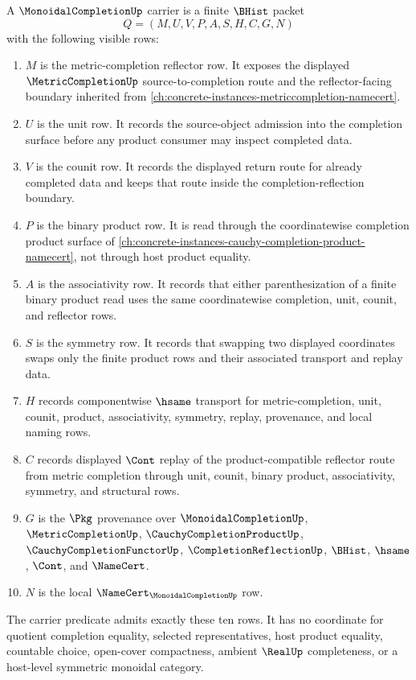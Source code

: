 \begin{definition}
\label{def:monoidal-completion-carrier}
A $\MonoidalCompletionUp$ carrier is a finite $\BHist$ packet
$$
Q=(M,U,V,P,A,S,H,C,G,N)
$$
with the following visible rows:
\begin{enumerate}
\item $M$ is the metric-completion reflector row. It exposes the displayed $\MetricCompletionUp$ source-to-completion route and the reflector-facing boundary inherited from \autoref{ch:concrete-instances-metriccompletion-namecert}.
\item $U$ is the unit row. It records the source-object admission into the completion surface before any product consumer may inspect completed data.
\item $V$ is the counit row. It records the displayed return route for already completed data and keeps that route inside the completion-reflection boundary.
\item $P$ is the binary product row. It is read through the coordinatewise completion product surface of \autoref{ch:concrete-instances-cauchy-completion-product-namecert}, not through host product equality.
\item $A$ is the associativity row. It records that either parenthesization of a finite binary product read uses the same coordinatewise completion, unit, counit, and reflector rows.
\item $S$ is the symmetry row. It records that swapping two displayed coordinates swaps only the finite product rows and their associated transport and replay data.
\item $H$ records componentwise $\hsame$ transport for metric-completion, unit, counit, product, associativity, symmetry, replay, provenance, and local naming rows.
\item $C$ records displayed $\Cont$ replay of the product-compatible reflector route from metric completion through unit, counit, binary product, associativity, symmetry, and structural rows.
\item $G$ is the $\Pkg$ provenance over $\MonoidalCompletionUp$, $\MetricCompletionUp$, $\CauchyCompletionProductUp$, $\CauchyCompletionFunctorUp$, $\CompletionReflectionUp$, $\BHist$, $\hsame$, $\Cont$, and $\NameCert$.
\item $N$ is the local $\NameCert_{\MonoidalCompletionUp}$ row.
\end{enumerate}
The carrier predicate admits exactly these ten rows. It has no coordinate for quotient completion equality, selected representatives, host product equality, countable choice, open-cover compactness, ambient $\RealUp$ completeness, or a host-level symmetric monoidal category.
\end{definition}

